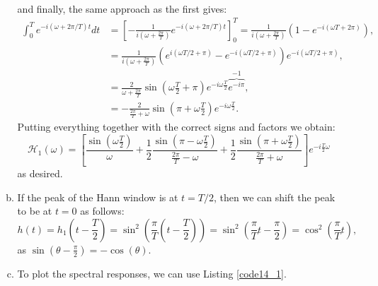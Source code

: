 \begin{enumerate}
\begin{enumerate}[a)]
\begin{align*}
                \end{align*}
                and finally, the same approach as the first gives:
                \begin{align*}
                  \int_{0}^{T}e^{-i(\omega+2\pi/T)t}dt & =\left[-\frac{1}{i(\omega+\frac{2\pi}{T})}e^{-i(\omega+2\pi/T)t}\right]_{0}^{T}=\frac{1}{i(\omega+\frac{2\pi}{T})}(1-e^{-i(\omega T + 2\pi)}), \\
                                                       & =\frac{1}{i(\omega+\frac{2\pi}{T})}(e^{i(\omega T/2+\pi)}-e^{-i(\omega T/2+\pi)})e^{-i(\omega T/2+\pi)},                                       \\
                                                       & =\frac{2}{\omega+\frac{2\pi}{T}}\sin\left(\omega\frac{T}{2}+\pi\right)e^{-i\omega\frac{T}{2}}\overbrace{e^{-i\pi}}^{-1},                       \\
                                                       & =-\frac{2}{\frac{2\pi}{T}+\omega}\sin\left(\pi+\omega\frac{T}{2}\right)e^{-i\omega\frac{T}{2}}.
                \end{align*}
                Putting everything together with the correct signs and factors we obtain:
                \[ \mathcal{H}_{1}(\omega)=\left[\frac{\sin\left(\omega\frac{T }{2}\right)}{\omega}+\frac{1}{2}\frac{\sin\left(\pi-\omega\frac{T}{2}\right)}{\frac{2\pi}{T}-\omega}+\frac{1}{2}\frac{\sin\left(\pi+\omega\frac{T}{2}\right)}{\frac{2\pi}{T}+\omega}\right]e^{-i\frac{T}{2}\omega} \]
                as desired.

          \item If the peak of the Hann window is at $t=T/2$, then we can shift the peak to be at $t=0$ as follows:
                \[ h(t)=h_{1}\left(t-\frac{T}{2}\right)=\sin^{2}\left(\frac{\pi}{T}\left(t-\frac{T}{2}\right)\right)=\sin^{2}\left(\frac{\pi}{T}t-\frac{\pi}{2}\right)=\cos^{2}\left(\frac{\pi}{T}t\right), \]
                as $\sin\left(\theta-\frac{\pi}{2}\right)=-\cos(\theta)$.

          \item To plot the spectral responses, we can use Listing \ref{code14_1}.
                


\end{enumerate}
\end{enumerate}
